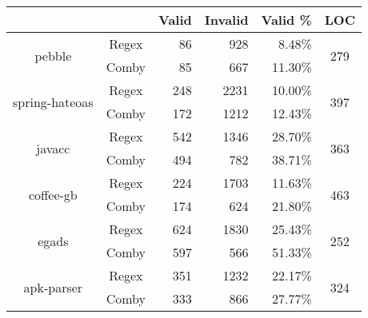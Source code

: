 \documentclass[sigconf,review, anonymous]{acmart}
\begin{document}
{\begin{table}[hbtp]
{\begin{tabular}{|c|c|c|r|r|r|c|}
\hline
 & \multicolumn{2}{c|}{} & \textbf{Valid} & \textbf{Invalid} & \textbf{Valid \%} & \textbf{LOC}\\ \hline
\multirow{2}{*}{pebble} & \multicolumn{2}{c|}{Regex} & 86 \hspace{8pt} & 928 \hspace{8pt} & 8.48\%  & \multirow{2}{*}{279}\\\cline{2-6}
    & \multicolumn{2}{c|}{Comby} & 85 \hspace{8pt} & 667 \hspace{8pt} & 11.30\% & \\ \hline
\multirow{2}{*}{spring-hateoas} & \multicolumn{2}{c|}{Regex} & 248 \hspace{8pt} & 2231 \hspace{8pt} & 10.00\% & \multirow{2}{*}{397}\\\cline{2-6}
    & \multicolumn{2}{c|}{Comby} & 172 \hspace{8pt} & 1212 \hspace{8pt} & 12.43\% & \\ \hline
\multirow{2}{*}{javacc} & \multicolumn{2}{c|}{Regex} & 542 \hspace{8pt} & 1346 \hspace{8pt} & 28.70\% & \multirow{2}{*}{363}\\\cline{2-6}
    & \multicolumn{2}{c|}{Comby} & 494 \hspace{8pt} & 782 \hspace{8pt} & 38.71\% & \\ \hline
    
\multirow{2}{*}{coffee-gb} & \multicolumn{2}{c|}{Regex} & 224 \hspace{8pt} & 1703 \hspace{8pt} & 11.63\% & \multirow{2}{*}{463}\\\cline{2-6}
    & \multicolumn{2}{c|}{Comby} & 174 \hspace{8pt} & 624 \hspace{8pt} & 21.80\% & \\ \hline
\multirow{2}{*}{egads} & \multicolumn{2}{c|}{Regex} & 624 \hspace{8pt} & 1830 \hspace{8pt} & 25.43\% & \multirow{2}{*}{252}\\\cline{2-6}
    & \multicolumn{2}{c|}{Comby} & 597 \hspace{8pt} & 566 \hspace{8pt} & 51.33\% & \\ \hline
\multirow{2}{*}{apk-parser} & \multicolumn{2}{c|}{Regex} & 351 \hspace{8pt} & 1232 \hspace{8pt} & 22.17\% & \multirow{2}{*}{324}\\\cline{2-6}
    & \multicolumn{2}{c|}{Comby} & 333 \hspace{8pt} & 866 \hspace{8pt} & 27.77\% & \\ \hline


\end{tabular}}
\end{table}}
\end{document}
